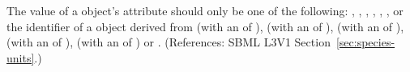 The value of a \Species object's  attribute should
only be one of the following: , , ,
, , ,  or the
identifier of a \UnitDefinition object derived from  (with an
 of ),  (with an  of
),  (with an  of ), 
(with an  of ),  (with an
 of ) or .  (References: SBML
L3V1 Section~\ref{sec:species-units}.)

